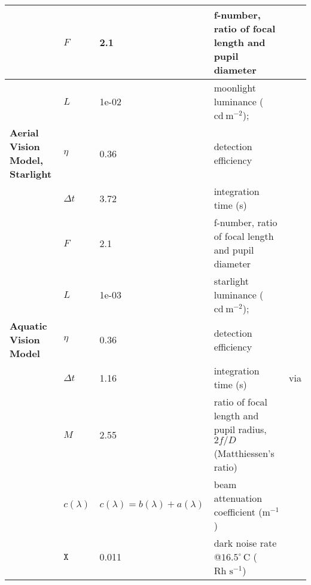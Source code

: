 \begin{tabular}{|L{3.5cm}|L{2cm}|L{2cm}|L{4.5cm}|L{4.5cm}|}
 &$F$&2.1&f-number, ratio of focal length and pupil diameter&\cite{Mill79a}\\\hline
 &$L$&1e-02&moonlight luminance  ($\text{cd}~ \text{m}^{-2}$);&\cite{Midd52a}\\\hline
\textbf{Aerial Vision Model, Starlight}&$\eta$&0.36&detection efficiency&\cite{Nils14a}\\\hline
 &$\Delta t$&3.72&integration time (s)&\cite{Donn95a}\\\hline
 &$F$&2.1&f-number, ratio of focal length and pupil diameter&\cite{Mill79a}\\\hline
 &$L$&1e-03&starlight luminance ($\text{cd}~ \text{m}^{-2}$);&\cite{Midd52a}\\\hline
\textbf{Aquatic Vision Model}&$\eta$&0.36&detection efficiency&\cite{Nils14a}\\\hline
 &$\Delta t$&1.16&integration time (s)&\cite{Donn95a} via \cite{Nils14a}\\\hline
 &$M$&2.55&ratio of focal length and pupil radius, $2f/D$ (Matthiessen's ratio)&\cite{Nils14a}\\\hline
 &$c(\lambda)$&$c(\lambda)=b(\lambda)+a(\lambda)$&beam attenuation coefficient ($\text{m}^{-1}$)&\cite{Midd52a}\\\hline
 &$\mathtt{X}$&0.011&dark noise rate @$16.5^{\circ} \, \text{C}$ ($\text{Rh} \text{~s}^{-1}$)&\cite{Aho93a}\\\hline
\end{tabular}
